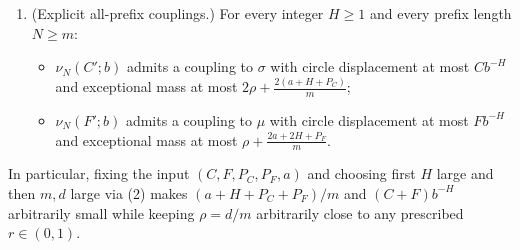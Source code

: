 \documentclass[11pt]{article}
\begin{document}
\begin{lemma}
\begin{enumerate}[label=\textup{(\arabic*)},nosep]
\begin{itemize}[nosep]
\item $\sigma'$ admits a coupling to $\frac{1}{1+\rho}\sigma+\frac{\rho}{1+\rho}\delta_0$ with circle displacement at most $Cb^{-H}$ and exceptional mass at most $\frac{2a+2H+P_C}{q}<\frac{2a+2H+P_C}{m}$;
\item $\mu'$ admits a coupling to $(1-\rho)\mu+\rho(\mu*\mu)$ with circle displacement at most $Fb^{-H}$ and exceptional mass at most $\frac{2a+2H+P_F}{m}$.
\end{itemize}
\item \textup{(Explicit all-prefix couplings.)} For every integer $H\ge1$ and every prefix length $N\ge m$:
\begin{itemize}[nosep]
\item $\nu_N(C';b)$ admits a coupling to $\sigma$ with circle displacement at most $Cb^{-H}$ and exceptional mass at most $2\rho+\frac{2(a+H+P_C)}{m}$;
\item $\nu_N(F';b)$ admits a coupling to $\mu$ with circle displacement at most $Fb^{-H}$ and exceptional mass at most $\rho+\frac{2a+2H+P_F}{m}$.
\end{itemize}
\end{enumerate}
In particular, fixing the input $(C,F,P_C,P_F,a)$ and choosing first $H$ large and then $m,d$ large via \textup{(2)} makes $(a+H+P_C+P_F)/m$ and $(C+F)b^{-H}$ arbitrarily small while keeping $\rho=d/m$ arbitrarily close to any prescribed $r\in(0,1)$.
\end{lemma}
\end{document}
